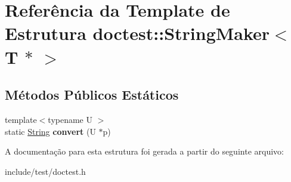 \hypertarget{structdoctest_1_1StringMaker_3_01T_01_5_01_4}{}\section{Referência da Template de Estrutura doctest\+:\+:String\+Maker$<$ T $\ast$ $>$}
\label{structdoctest_1_1StringMaker_3_01T_01_5_01_4}
\subsection*{Métodos Públicos Estáticos}
\begin{DoxyCompactItemize}
\item 
\mbox{\label{structdoctest_1_1StringMaker_3_01T_01_5_01_4_a79dfd2e72f48a1d9941b924d6ac23104}} 
{\footnotesize template$<$typename U $>$ }\\static \hyperlink{classdoctest_1_1String}{String} {\bfseries convert} (U $\ast$p)
\end{DoxyCompactItemize}


A documentação para esta estrutura foi gerada a partir do seguinte arquivo\+:\begin{DoxyCompactItemize}
\item 
include/test/doctest.\+h\end{DoxyCompactItemize}
